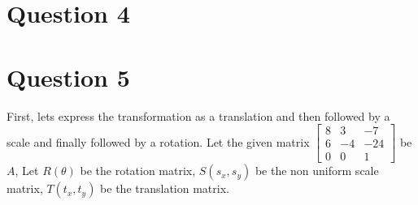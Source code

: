 \documentclass{article} %
\begin{document}
\section{Question 4}



\section{Question 5}

First, lets express the transformation as a translation and then followed by a scale and finally followed by a rotation. Let the given matrix $ \left[
\begin{matrix}
8 & 3 & -7\\
6 & -4 & -24\\
0 & 0 & 1
\end{matrix}
\right]$ be $A$,
Let $R(\theta)$ be the rotation matrix, $S(s_x, s_y)$ be the non uniform scale matrix, $T(t_x, t_y)$ be the translation matrix.
\end{document}
